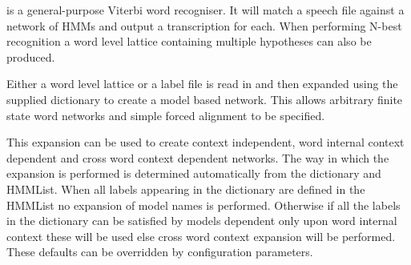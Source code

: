 %
%

\newpage
{}


 is a general-purpose Viterbi word recogniser.  It will 
match a speech file against a network of HMMs and output a transcription 
for each.  When performing N-best recognition a word level lattice 
containing multiple hypotheses can also be produced.

Either a word level lattice or a label file is read in and then
expanded using the supplied dictionary to create a model based 
network.  This allows arbitrary finite state word networks and
simple forced alignment to be specified.

This expansion can be used to create context independent, word internal
context dependent and cross word context dependent networks.  The way
in which the expansion is performed is determined automatically from
the dictionary and HMMList.  When all labels appearing in the
dictionary are defined in the HMMList no expansion of model names is 
performed.  Otherwise if all the labels in the dictionary can be 
satisfied by models dependent only upon word internal context these
will be used else cross word context expansion will be performed.
These defaults can be overridden by  configuration parameters.

